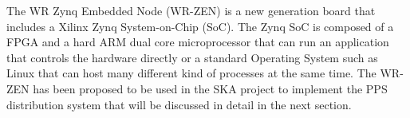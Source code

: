 
The WR Zynq Embedded Node (WR-ZEN) is a new generation board that includes a Xilinx Zynq System-on-Chip (SoC). The Zynq SoC is composed of a FPGA and a hard ARM dual core microprocessor that can run an application that controls the hardware directly or a standard Operating System such as Linux that can host many different kind of processes at the same time. The WR-ZEN has been proposed to be used in the SKA project to implement the PPS distribution system that will be discussed in detail in the next section.
